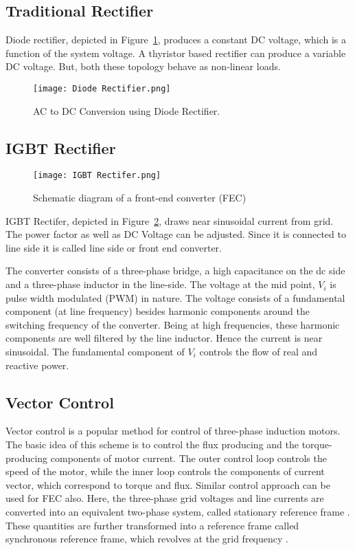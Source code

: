 \subsection{Traditional Rectifier}
Diode rectifier, depicted in Figure~\ref{fig:diode_rectifier}, produces a
constant DC voltage, which is a function of the system voltage. A thyristor
based rectifier can produce a variable DC voltage. But, both these topology
behave as non-linear loads.

\begin{figure}[h]
    \centering
    \texttt{[image: Diode Rectifier.png]}
    \caption{AC to DC Conversion using Diode Rectifier.}
    \label{fig:diode_rectifier}
\end{figure}

\subsection{IGBT Rectifier}
\begin{figure}[h]
    \centering
    \texttt{[image: IGBT Rectifer.png]}
    \caption{Schematic diagram of
        a front-end converter (FEC)}
    \label{fig:igbt_rectifier}
\end{figure}
\noindent
IGBT Rectifer, depicted in Figure~\ref{fig:igbt_rectifier}, draws near
sinusoidal current from grid. The power factor as well as DC Voltage can be
adjusted. Since it is connected to line side it is called line side or front
end converter.

The converter consists of a three-phase bridge, a high capacitance on the dc
side and a three-phase inductor in the line-side. The voltage at the mid point,
$V_i$ is pulse width modulated (PWM) in nature. The voltage consists of a
fundamental component (at line frequency) besides harmonic components around
the switching frequency of the converter. Being at high frequencies, these
harmonic components are well filtered by the line inductor. Hence the current
is near sinusoidal. The fundamental component of $V_i$ controls the flow of
real and reactive power.

\subsection{Vector Control}
Vector control is a popular method for control of three-phase induction motors.
The basic idea of this scheme is to control the flux producing and the
torque-producing components of motor current. The outer control loop controls
the speed of the motor, while the inner loop controls the components of current
vector, which correspond to torque and flux. Similar control approach can be
used for FEC also. Here, the three-phase grid voltages and line currents are
converted into an equivalent two-phase system, called stationary reference
frame . These quantities are further transformed into
a reference frame called synchronous reference frame, which revolves at the
grid frequency .

